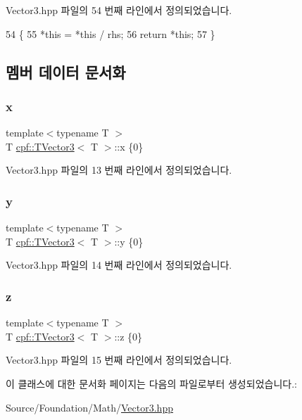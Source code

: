 Vector3.\+hpp 파일의 54 번째 라인에서 정의되었습니다.


\begin{DoxyCode}
54                                                   \{
55             *\textcolor{keyword}{this} = *\textcolor{keyword}{this} / rhs;
56             \textcolor{keywordflow}{return} *\textcolor{keyword}{this};
57         \}
\end{DoxyCode}


\subsection{멤버 데이터 문서화}
\mbox{\label{classcpf_1_1_t_vector3_ad3df42808358a64c518d6349ede446d8}} 
\subsubsection{\texorpdfstring{x}{x}}
{\footnotesize\ttfamily template$<$typename T $>$ \\
T \hyperlink{classcpf_1_1_t_vector3}{cpf\+::\+T\+Vector3}$<$ T $>$\+::x \{0\}}



Vector3.\+hpp 파일의 13 번째 라인에서 정의되었습니다.

\mbox{\label{classcpf_1_1_t_vector3_a2371a0583e76dcc80c6f10dd168cde1b}} 
\subsubsection{\texorpdfstring{y}{y}}
{\footnotesize\ttfamily template$<$typename T $>$ \\
T \hyperlink{classcpf_1_1_t_vector3}{cpf\+::\+T\+Vector3}$<$ T $>$\+::y \{0\}}



Vector3.\+hpp 파일의 14 번째 라인에서 정의되었습니다.

\mbox{\label{classcpf_1_1_t_vector3_ae7ea5f4b24c3438a44eb6b0fdfe02823}} 
\subsubsection{\texorpdfstring{z}{z}}
{\footnotesize\ttfamily template$<$typename T $>$ \\
T \hyperlink{classcpf_1_1_t_vector3}{cpf\+::\+T\+Vector3}$<$ T $>$\+::z \{0\}}



Vector3.\+hpp 파일의 15 번째 라인에서 정의되었습니다.



이 클래스에 대한 문서화 페이지는 다음의 파일로부터 생성되었습니다.\+:\begin{DoxyCompactItemize}
\item 
Source/\+Foundation/\+Math/\hyperlink{_vector3_8hpp}{Vector3.\+hpp}\end{DoxyCompactItemize}
